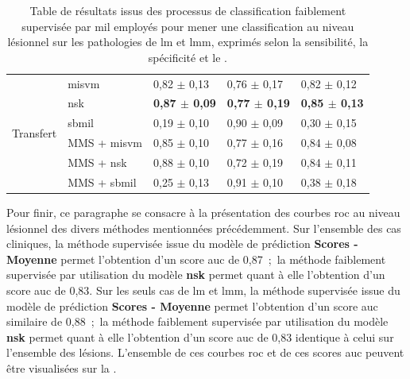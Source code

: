 \begin{table}[H]
\begin{tabular}{cllll}
        \multirow{6}{*}{Transfert}   & \gls{misvm}              & 0,82 $\pm$ 0,13             & 0,76 $\pm$ 0,17             & 0,82 $\pm$ 0,12             \\
                                     & \gls{nsk}                & \textbf{0,87 $\pm$ 0,09}    & \textbf{0,77 $\pm$ 0,19}    & \textbf{0,85 $\pm$ 0,13}    \\
                                     & \gls{sbmil}              & 0,19 $\pm$ 0,10             & 0,90 $\pm$ 0,09             & 0,30 $\pm$ 0,15             \\
                                     & MMS + \gls{misvm}        & 0,85 $\pm$ 0,10             & 0,77 $\pm$ 0,16             & 0,84 $\pm$ 0,08             \\
                                     & MMS + \gls{nsk}          & 0,88 $\pm$ 0,10             & 0,72 $\pm$ 0,19             & 0,84 $\pm$ 0,11             \\
                                     & MMS + \gls{sbmil}        & 0,25 $\pm$ 0,13             & 0,91 $\pm$ 0,10             & 0,38 $\pm$ 0,18             \\ \bottomrule
    \end{tabular}
    \caption{Table de résultats issus des processus de classification faiblement supervisée par \gls{mil} employés pour mener une classification au niveau lésionnel sur les pathologies de \gls{lm} et \gls{lmm}, exprimés selon la sensibilité, la spécificité et le \fscore{}.}
    \label{tab:results_lesion_classification_weakly_patient_lm}
\end{table}

Pour finir, ce paragraphe se consacre à la présentation des courbes \gls{roc} au niveau lésionnel des divers méthodes mentionnées précédemment. Sur l'ensemble des cas cliniques, la méthode supervisée issue du modèle de prédiction \textbf{Scores - Moyenne} permet l'obtention d'un score \gls{auc} de 0,87~;~la méthode faiblement supervisée par utilisation du modèle \textbf{\gls{nsk}} permet quant à elle l'obtention d'un score \gls{auc} de 0,83. Sur les seuls cas de \gls{lm} et \gls{lmm}, la méthode supervisée issue du modèle de prédiction \textbf{Scores - Moyenne} permet l'obtention d'un score \gls{auc} similaire de 0,88~;~la méthode faiblement supervisée par utilisation du modèle \textbf{\gls{nsk}} permet quant à elle l'obtention d'un score \gls{auc} de 0,83 identique à celui sur l'ensemble des lésions. L'ensemble de ces courbes \gls{roc} et de ces scores \gls{auc} peuvent être visualisées sur la .\par


